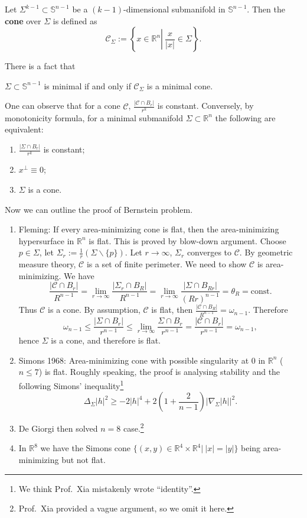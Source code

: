 \begin{defn}
    Let $\Sigma^{k-1}\subset\mathbb{S}^{n-1}$ be a $(k-1)$-dimensional submanifold in $\mathbb{S}^{n-1}$.
    Then the \textbf{cone} over $\Sigma$ is defined as
    \[\mathscr{C}_\Sigma:=\left\{x\in\mathbb{R}^n\left|\ \frac{x}{|x|}\in\Sigma\right.\right\}.\]
\end{defn}

There is a fact that
\begin{prop}
    $\Sigma\subset\mathbb{S}^{n-1}$ is minimal if and only if $\mathscr{C}_\Sigma$ is a minimal cone.
\end{prop}

One can observe that for a cone $\mathscr{C}$, $\frac{|\mathscr{C}\cap B_r|}{r^k}$ is constant.
Conversely, by monotonicity formula, for a minimal submanifold $\Sigma\subset\mathbb{R}^n$ the following are equivalent:
\begin{enumerate}[(1)]
    \item $\frac{|\Sigma\cap B_r|}{r^k}$ is constant;
    \item $x^\perp\equiv 0$;
    \item $\Sigma$ is a cone.
\end{enumerate}

Now we can outline the proof of Bernstein problem.
\begin{enumerate}
    \item Fleming:
    If every area-minimizing cone is flat, then the area-minimizing hypersurface in $\mathbb{R}^n$ is flat.
    This is proved by blow-down argument.
    Choose $p\in\Sigma$, let $\Sigma_r:=\frac{1}{r}(\Sigma\backslash\{p\})$.
    Let $r\to\infty$, $\Sigma_r$ converges to $\mathscr{C}$.
    By geometric measure theory, $\mathscr{C}$ is a set of finite perimeter.
    We need to show $\mathscr{C}$ is area-minimizing.
    We have
    \[\frac{|\mathscr{C}\cap B_r|}{R^{n-1}}=\lim_{r\to\infty}\frac{|\Sigma_r\cap B_R|}{R^{n-1}}=\lim_{r\to\infty}\frac{|\Sigma\cap B_{Rr}|}{(Rr)^{n-1}}=\theta_R=\text{const}.\]
    Thus $\mathscr{C}$ is a cone.
    By assumption, $\mathscr{C}$ is flat, then $\frac{|\mathscr{C}\cap B_R|}{R^{n-1}}=\omega_{n-1}$.
    Therefore
    \[\omega_{n-1}\leq\frac{|\Sigma\cap B_r|}{r^{n-1}}\leq\lim_{r\to\infty}\frac{\Sigma\cap B_r}{r^{n-1}}=\frac{|\mathscr{C}\cap B_r|}{r^{n-1}}=\omega_{n-1},\]
    hence $\Sigma$ is a cone, and therefore is flat.
    \item Simons 1968:
    Area-minimizing cone with possible singularity at $0$ in $\mathbb{R}^n$ ($n\leq 7$) is flat.
    Roughly speaking, the proof is analysing stability and the following Simons' inequality\footnote{We think Prof.\ Xia mistakenly wrote ``identity''.}
    \[\Delta_\Sigma|h|^2\geq -2|h|^4+2\left(1+\frac{2}{n-1}\right)|\nabla_\Sigma|h||^2.\]
    \item De Giorgi then solved $n=8$ case.\footnote{Prof.\ Xia provided a vague argument, so we omit it here.}
    \item In $\mathbb{R}^8$ we have the Simons cone $\{(x,y)\in\mathbb{R}^4\times\mathbb{R}^4|\ |x|=|y|\}$ being area-minimizing but not flat.
\end{enumerate}

